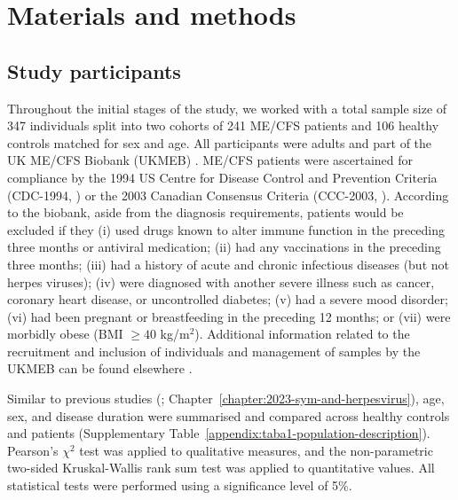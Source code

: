 \section{Materials and methods}


\subsection{Study participants}

Throughout the initial stages of the study, we worked with a total sample size of 347 individuals split into two cohorts of 241 ME/CFS patients and 106 healthy controls matched for sex and age.
All participants were adults and part of the UK ME/CFS Biobank (UKMEB) \citep{lacerda2017UKME}.
ME/CFS patients were ascertained for compliance by the 1994 US Centre for Disease Control and Prevention Criteria (CDC-1994, \citealt{fukuda1994ChronicFatigue}) or the 2003 Canadian Consensus Criteria (CCC-2003, \citealt{carruthers2003MyalgicEncephalomyelitis}).
According to the biobank, aside from the diagnosis requirements, patients would be excluded if they (i) used drugs known to alter immune function in the preceding three months or antiviral medication; (ii) had any vaccinations in the preceding three months; (iii) had a history of acute and chronic infectious diseases (but not herpes viruses); (iv) were diagnosed with another severe illness such as cancer, coronary heart disease, or uncontrolled diabetes; (v) had a severe mood disorder; (vi) had been pregnant or breastfeeding in the preceding 12 months; or (vii) were morbidly obese (BMI ${\geq 40}$ kg/m${^2}$).
Additional information related to the recruitment and inclusion of individuals and management of samples by the UKMEB can be found elsewhere \citep{lacerda2017UKME, lacerda2018UKME}.

Similar to previous studies (\citealt{cliff2019CellularImmune, domingues2023AssociationAnalysis}; Chapter~\ref{chapter:2023-sym-and-herpesvirus}), age, sex, and disease duration were summarised and compared across healthy controls and patients (Supplementary Table~\ref{appendix:taba1-population-description}).
Pearson's $\chi^2$ test was applied to qualitative measures, and the non-parametric two-sided Kruskal-Wallis rank sum test was applied to quantitative values.
All statistical tests were performed using a significance level of 5\%.

